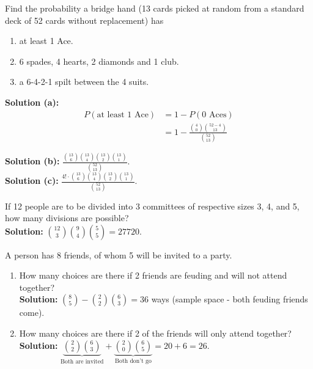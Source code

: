\begin{example}
    Find the probability a bridge hand (13 cards picked at random from a standard deck of 52 cards without replacement) has
    \begin{enumerate}[label={(\alph*)}]
        \item at least 1 Ace.
        \item 6 spades, 4 hearts, 2 diamonds and 1 club.
        \item a 6-4-2-1 spilt between the 4 suits.
    \end{enumerate}
    \textbf{Solution (a): } \vspace*{-5mm}
    \begin{align*}
        P(\text{at least 1 Ace}) &= 1 - P(\text{0 Aces}) \\
        &= 1 - \frac{\binom{4}{0} \binom{52-4}{13}}{\binom{52}{13}}
    \end{align*}

    \textbf{Solution (b): } \vspace*{-3mm}
    $\frac{\binom{13}{6} \binom{13}{4} \binom{13}{2} \binom{13}{1}}{\binom{52}{13}}$. \\

    \textbf{Solution (c): } \vspace*{-3mm}
    $\frac{4! \cdot \binom{13}{6}\binom{13}{4}\binom{13}{2}\binom{13}{1}}{\binom{52}{13}}$. \vspace{2mm}
\end{example}

\begin{example}
    If 12 people are to be divided into 3 committees of respective sizes 3, 4, and 5,
    how many divisions are possible? \\
    \textbf{Solution: }
    $\binom{12}{3} \binom{9}{4} \binom{5}{5} = 27720$.
\end{example}

\begin{example}
    A person has 8 friends, of whom 5 will be invited to a party. 
    \begin{enumerate}[label=(\alph*)]
        \item How many choices are there if 2 friends are feuding and will not attend together? \\
        \textbf{Solution: } 
        $\binom{8}{5} - \binom{2}{2}\binom{6}{3} = 36$ ways (sample space - both feuding friends come).
        \item How many choices are there if 2 of the friends will only attend together? \\
        \textbf{Solution: }
        $\underbrace{\binom{2}{2} \binom{6}{3}}_{\text{Both are invited}}  + \underbrace{\binom{2}{0} \binom{6}{5}}_{\text{Both don't go}}  = 20 + 6 = 26$. 
    \end{enumerate}
\end{example}

